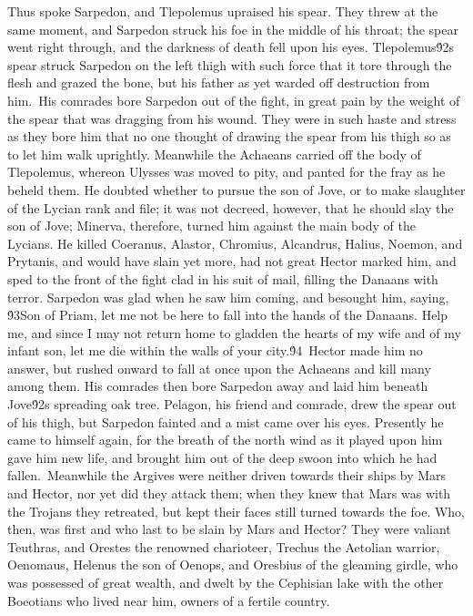 {Thus spoke Sarpedon, and Tlepolemus upraised his spear. They threw at the same moment, and Sarpedon struck his foe in the middle of his throat; the spear went right through, and the darkness of death fell upon his eyes. Tlepolemus\'92s spear struck Sarpedon on the left thigh with such force that it tore through the flesh and grazed the bone, but his father as yet warded off destruction from him.\
His comrades bore Sarpedon out of the fight, in great pain by the weight of the spear that was dragging from his wound. They were in such haste and stress as they bore him that no one thought of drawing the spear from his thigh so as to let him walk uprightly. Meanwhile the Achaeans carried off the body of Tlepolemus, whereon Ulysses was moved to pity, and panted for the fray as he beheld them. He doubted whether to pursue the son of Jove, or to make slaughter of the Lycian rank and file; it was not decreed, however, that he should slay the son of Jove; Minerva, therefore, turned him against the main body of the Lycians. He killed Coeranus, Alastor, Chromius, Alcandrus, Halius, Noemon, and Prytanis, and would have slain yet more, had not great Hector marked him, and sped to the front of the fight clad in his suit of mail, filling the Danaans with terror. Sarpedon was glad when he saw him coming, and besought him, saying, \'93Son of Priam, let me not be here to fall into the hands of the Danaans. Help me, and since I may not return home to gladden the hearts of my wife and of my infant son, let me die within the walls of your city.\'94\
Hector made him no answer, but rushed onward to fall at once upon the Achaeans and kill many among them. His comrades then bore Sarpedon away and laid him beneath Jove\'92s spreading oak tree. Pelagon, his friend and comrade, drew the spear out of his thigh, but Sarpedon fainted and a mist came over his eyes. Presently he came to himself again, for the breath of the north wind as it played upon him gave him new life, and brought him out of the deep swoon into which he had fallen.\
Meanwhile the Argives were neither driven towards their ships by Mars and Hector, nor yet did they attack them; when they knew that Mars was with the Trojans they retreated, but kept their faces still turned towards the foe. Who, then, was first and who last to be slain by Mars and Hector? They were valiant Teuthras, and Orestes the renowned charioteer, Trechus the Aetolian warrior, Oenomaus, Helenus the son of Oenops, and Oresbius of the gleaming girdle, who was possessed of great wealth, and dwelt by the Cephisian lake with the other Boeotians who lived near him, owners of a fertile country.\
}
